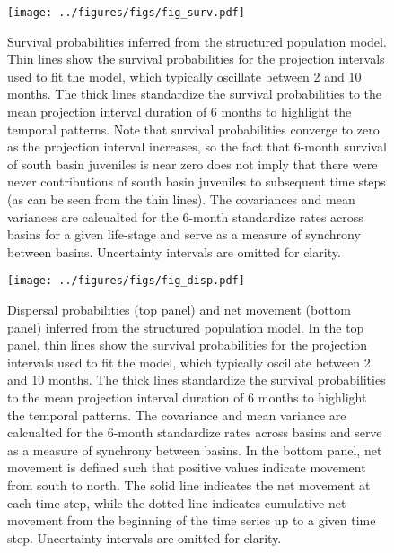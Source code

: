 \documentclass[11pt]{article}
\begin{document}
{%
\clearpage
\begin{figure}
\centering
\texttt{[image: ../figures/figs/fig\_surv.pdf]}
\caption{\label{fig:surv}
Survival probabilities inferred from the structured population model.
Thin lines show the survival probabilities for the projection intervals
used to fit the model, 
which typically oscillate between 2 and 10 months.
The thick lines standardize the survival probabilities to the mean 
projection interval duration of 6 months to highlight the temporal patterns.
Note that survival probabilities converge to zero as the projection interval increases,
so the fact that 6-month survival of south basin juveniles is near zero does not 
imply that there were never contributions of south basin juveniles to subsequent time steps
(as can be seen from the thin lines).
The covariances and mean variances are calcualted 
for the 6-month standardize rates
across basins for a given life-stage
and serve as a measure of synchrony between basins.
Uncertainty intervals are omitted for clarity.
}
\end{figure}
\clearpage

\clearpage
\begin{figure}
\centering
\texttt{[image: ../figures/figs/fig\_disp.pdf]}
\caption{\label{fig:disp}
Dispersal probabilities (top panel) and net movement (bottom panel)
inferred from the structured population model.
In the top panel,
thin lines show the survival probabilities for the projection intervals
used to fit the model, 
which typically oscillate between 2 and 10 months.
The thick lines standardize the survival probabilities to the mean 
projection interval duration of 6 months to highlight the temporal patterns.
The covariance and mean variance are calcualted 
for the 6-month standardize rates
across basins
and serve as a measure of synchrony between basins.
In the bottom panel,
net movement is defined such that positive values indicate movement from
south to north.
The solid line indicates the net movement at each time step,
while the dotted line indicates cumulative net movement from the 
beginning of the time series up to a given time step.
Uncertainty intervals are omitted for clarity.
}
\end{figure}
\clearpage

}
\end{document}
